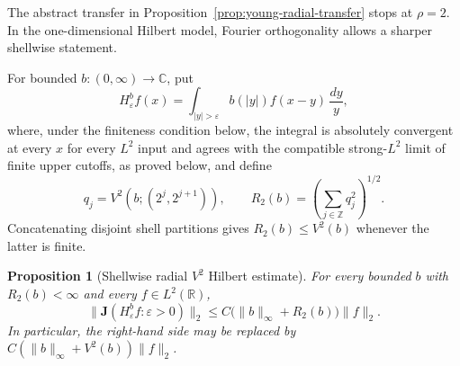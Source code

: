 \documentclass[11pt]{article}
\numberwithin{equation}{section}
\newtheorem{proposition}[theorem]{Proposition}
\theoremstyle{remark}
\theoremstyle{definition}
\newcommand{\R}{\mathbb R}
\begin{document}
The abstract transfer in Proposition~\ref{prop:young-radial-transfer} stops
at $\rho=2$.  In the one-dimensional Hilbert model, Fourier orthogonality
allows a sharper shellwise statement.

For bounded $b:(0,\infty)\to\mathbb C$, put
\[
 H^b_\varepsilon f(x)=\int_{|y|>\varepsilon}b(|y|)f(x-y)\,\frac{dy}{y},
\]
where, under the finiteness condition below, the integral is absolutely
convergent at every $x$ for every $L^2$ input and agrees with the
compatible strong-$L^2$ limit of finite upper cutoffs, as proved below,
and define
\begin{equation}\label{eq:hilbert-shell-r2}
 q_j=V^2(b;(2^j,2^{j+1})),\qquad
 R_2(b)=\left(\sum_{j\in\mathbb Z}q_j^2\right)^{1/2}.
\end{equation}
Concatenating disjoint shell partitions gives $R_2(b)\le V^2(b)$ whenever
the latter is finite.

\begin{proposition}[Shellwise radial $V^2$ Hilbert estimate]
\label{prop:hilbert-radial-v2}
For every bounded $b$ with $R_2(b)<\infty$ and every $f\in L^2(\R)$,
\begin{equation}\label{eq:hilbert-radial-v2}
 \|\mathbf J(H^b_\varepsilon f:\varepsilon>0)\|_2
 \le C\bigl(\|b\|_\infty+R_2(b)\bigr)\|f\|_2.
\end{equation}
In particular, the right-hand side may be replaced by
$C(\|b\|_\infty+V^2(b))\|f\|_2$.
\end{proposition}
\end{document}
